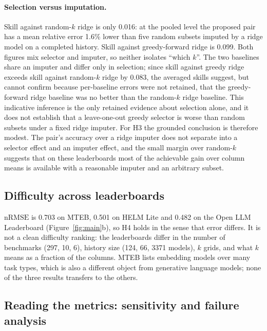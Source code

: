 \documentclass{article}
\newcommand{\nrmse}{\mathrm{nRMSE}}
\begin{document}
\paragraph{Selection versus imputation.} Skill against random-$k$ ridge is only 0.016: at the pooled level the proposed pair has a mean relative error 1.6\% lower than five random subsets imputed by a ridge model on a completed history. Skill against greedy-forward ridge is 0.099. %
Both figures mix selector and imputer, so neither isolates ``which $k$''. The two baselines share an imputer and differ only in selection; since skill against greedy ridge exceeds skill against random-$k$ ridge by 0.083, the averaged skills suggest, but cannot confirm because per-baseline errors were not retained, that the greedy-forward ridge baseline was no better than the random-$k$ ridge baseline. This indicative inference is the only retained evidence about selection alone, and it does not establish that a leave-one-out greedy selector is worse than random subsets under a fixed ridge imputer. For H3 the grounded conclusion is therefore modest. The pair's accuracy over a ridge imputer does not separate into a selector effect and an imputer effect, and the small margin over random-$k$ suggests that on these leaderboards most of the achievable gain over column means is available with a reasonable imputer and an arbitrary subset.

\subsection{Difficulty across leaderboards}
$\nrmse$ is 0.703 on MTEB, 0.501 on HELM Lite and 0.482 on the Open LLM Leaderboard (Figure~\ref{fig:main}b), so H4 holds in the sense that error differs. It is not a clean difficulty ranking: the leaderboards differ in the number of benchmarks (297, 10, 6), history size (124, 66, 3371 models), $k$ grids, and what $k$ means as a fraction of the columns. MTEB lists embedding models over many task types, which is also a different object from generative language models; none of the three results transfers to the others. %

\subsection{Reading the metrics: sensitivity and failure analysis}
\end{document}
